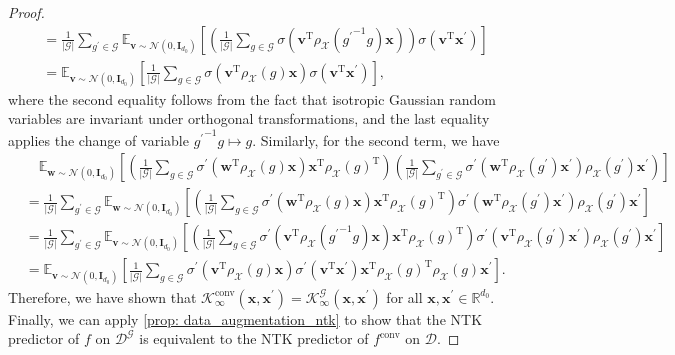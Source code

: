 \documentclass{article}
\newcommand{\T}{\mathrm{T}}
\newcommand{\G}{\mathcal{G}}
\newcommand{\X}{\mathcal{X}}
\theoremstyle{plain}
\theoremstyle{definition}
\theoremstyle{remark}
\theoremstyle{remark}
\begin{document}
\begin{proof}
\begin{align*}
    & = \frac{1}{|\G|} \sum_{g^\prime \in \G} \mathbb{E}_{\mathbf{v} \sim \mathcal{N}(0, \mathbf{I}_{d_0})}\left[ \left(\frac{1}{|\G|} \sum_{g \in \G}\sigma\left(\mathbf{v}^{\T} \rho_{\X}({g^{\prime}}^{-1}g) \mathbf{x}\right) \right)\sigma\left(\mathbf{v}^{\T} \mathbf{x}^{\prime}\right) \right] \nonumber \\
    & = \mathbb{E}_{\mathbf{v} \sim \mathcal{N}(0, \mathbf{I}_{d_0})}\left[ \frac{1}{|\G|} \sum_{g \in \G} \sigma(\mathbf{v}^{\T} \rho_{\X}(g) \mathbf{x}) \sigma\left(\mathbf{v}^{\T} \mathbf{x}^\prime\right) \right],
  \end{align*}
  where the second equality follows from the fact that isotropic Gaussian random variables are invariant under orthogonal transformations, and the last equality applies the change of variable ${g^\prime}^{-1}g \mapsto g$.
  Similarly, for the second term, we have 
  \begin{align*}
    &\quad  \mathbb{E}_{\mathbf{w} \sim \mathcal{N}(0, \mathbf{I}_{d_0})}\left[ \left(\frac{1}{|\G|} \sum_{g \in \G}\sigma^\prime\left(\mathbf{w}^{\T} \rho_{\X}(g) \mathbf{x}\right) \mathbf{x}^{\T} {\rho_{\X}(g)}^{\T} \right) \left(\frac{1}{|\G|} \sum_{g^{\prime} \in \G}\sigma^\prime\left(\mathbf{w}^{\T} \rho_{\X}(g^{\prime}) \mathbf{x}^{\prime}\right) {\rho_{\X}(g^{\prime})} \mathbf{x}^{\prime} \right) \right] \\
    &= \frac{1}{|\G|} \sum_{g^{\prime} \in \G} \mathbb{E}_{\mathbf{w} \sim \mathcal{N}(0, \mathbf{I}_{d_0})}\left[ \left(\frac{1}{|\G|} \sum_{g \in \G}\sigma^\prime\left(\mathbf{w}^{\T} \rho_{\X}(g) \mathbf{x}\right) \mathbf{x}^{\T} {\rho_{\X}(g)}^{\T} \right)\sigma^\prime\left(\mathbf{w}^{\T} \rho_{\X}(g^{\prime}) \mathbf{x}^{\prime}\right) {\rho_{\X}(g^{\prime})} \mathbf{x}^{\prime} \right]  \\
    &= \frac{1}{|\G|} \sum_{g^{\prime} \in \G} \mathbb{E}_{\mathbf{v} \sim \mathcal{N}(0, \mathbf{I}_{d_0})}\left[ \left(\frac{1}{|\G|} \sum_{g \in \G}\sigma^\prime\left(\mathbf{v}^{\T} \rho_{\X}({g^{\prime}}^{-1}g) \mathbf{x}\right) \mathbf{x}^{\T} {\rho_{\X}(g)}^{\T} \right)\sigma^\prime\left(\mathbf{v}^{\T} \rho_{\X}(g^{\prime}) \mathbf{x}^{\prime}\right) {\rho_{\X}(g^{\prime})} \mathbf{x}^{\prime} \right]  \\
    &= \mathbb{E}_{\mathbf{v} \sim \mathcal{N}(0, \mathbf{I}_{d_0})}\left[ \frac{1}{|\G|} \sum_{g \in \G} \sigma^\prime\left(\mathbf{v}^{\T} \rho_{\X}(g) \mathbf{x}\right) \sigma^\prime\left(\mathbf{v}^{\T} \mathbf{x}^{\prime}\right) \mathbf{x}^{\T} {\rho_{\X}(g)}^{\T}  {\rho_{\X}(g)} \mathbf{x}^{\prime} \right].
  \end{align*}
  Therefore, we have shown that $\mathcal{K}^{\text{conv}}_{\infty}(\mathbf{x}, \mathbf{x}^\prime) = \mathcal{K}_{\infty}^{\G}(\mathbf{x}, \mathbf{x}^\prime)$ for all $\mathbf{x}, \mathbf{x}^\prime \in \mathbb{R}^{d_0}$.
  Finally, we can apply \cref{prop: data_augmentation_ntk} to show that the NTK predictor of $f$ on $\mathcal{D}^{\G}$ is equivalent to the NTK predictor of $f^{\text{conv}}$ on $\mathcal{D}$.
\end{proof}
\end{document}
